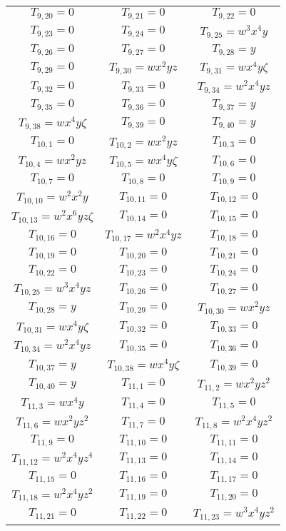 \begin{longtable}{|c|c|c|}
$T_{9,20}= 0$&
$T_{9,21}= 0$&
$T_{9,22}= 0$\\
$T_{9,23}= 0$&
$T_{9,24}= 0$&
$T_{9,25}= w^3x^4y$\\
$T_{9,26}= 0$&
$T_{9,27}= 0$&
$T_{9,28}= y$\\
$T_{9,29}= 0$&
$T_{9,30}= wx^2yz$&
$T_{9,31}= wx^4y\zeta$\\
$T_{9,32}= 0$&
$T_{9,33}= 0$&
$T_{9,34}= w^2x^4yz$\\
$T_{9,35}= 0$&
$T_{9,36}= 0$&
$T_{9,37}= y$\\
$T_{9,38}= wx^4y\zeta$&
$T_{9,39}= 0$&
$T_{9,40}= y$\\
$T_{10,1}= 0$&
$T_{10,2}= wx^2yz$&
$T_{10,3}= 0$\\
$T_{10,4}= wx^2yz$&
$T_{10,5}= wx^4y\zeta$&
$T_{10,6}= 0$\\
$T_{10,7}= 0$&
$T_{10,8}= 0$&
$T_{10,9}= 0$\\
$T_{10,10}= w^2x^2y$&
$T_{10,11}= 0$&
$T_{10,12}= 0$\\
$T_{10,13}= w^2x^6yz\zeta$&
$T_{10,14}= 0$&
$T_{10,15}= 0$\\
$T_{10,16}= 0$&
$T_{10,17}= w^2x^4yz$&
$T_{10,18}= 0$\\
$T_{10,19}= 0$&
$T_{10,20}= 0$&
$T_{10,21}= 0$\\
$T_{10,22}= 0$&
$T_{10,23}= 0$&
$T_{10,24}= 0$\\
$T_{10,25}= w^3x^4yz$&
$T_{10,26}= 0$&
$T_{10,27}= 0$\\
$T_{10,28}= y$&
$T_{10,29}= 0$&
$T_{10,30}= wx^2yz$\\
$T_{10,31}= wx^4y\zeta$&
$T_{10,32}= 0$&
$T_{10,33}= 0$\\
$T_{10,34}= w^2x^4yz$&
$T_{10,35}= 0$&
$T_{10,36}= 0$\\
$T_{10,37}= y$&
$T_{10,38}= wx^4y\zeta$&
$T_{10,39}= 0$\\
$T_{10,40}= y$&
$T_{11,1}= 0$&
$T_{11,2}= wx^2yz^2$\\
$T_{11,3}= wx^4y$&
$T_{11,4}= 0$&
$T_{11,5}= 0$\\
$T_{11,6}= wx^2yz^2$&
$T_{11,7}= 0$&
$T_{11,8}= w^2x^4yz^2$\\
$T_{11,9}= 0$&
$T_{11,10}= 0$&
$T_{11,11}= 0$\\
$T_{11,12}= w^2x^4yz^4$&
$T_{11,13}= 0$&
$T_{11,14}= 0$\\
$T_{11,15}= 0$&
$T_{11,16}= 0$&
$T_{11,17}= 0$\\
$T_{11,18}= w^2x^4yz^2$&
$T_{11,19}= 0$&
$T_{11,20}= 0$\\
$T_{11,21}= 0$&
$T_{11,22}= 0$&
$T_{11,23}= w^3x^4yz^2$\\

\end{longtable}
